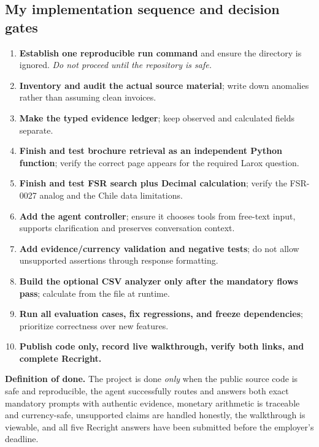 \documentclass[11pt,a4paper]{article}
\DeclareRobustCommand{\code}[1]{{\ttfamily\small\detokenize{#1}}}
\begin{document}
\subsection{My implementation sequence and decision gates}
\begin{enumerate}
\item \textbf{Establish one reproducible run command} and ensure the \code{data/} directory is ignored. \emph{Do not proceed until the repository is safe.}
\item \textbf{Inventory and audit the actual source material}; write down anomalies rather than assuming clean invoices.
\item \textbf{Make the typed evidence ledger}; keep observed and calculated fields separate.
\item \textbf{Finish and test brochure retrieval as an independent Python function}; verify the correct page appears for the required Larox question.
\item \textbf{Finish and test FSR search plus Decimal calculation}; verify the FSR-0027 analog and the Chile data limitations.
\item \textbf{Add the agent controller}; ensure it chooses tools from free-text input, supports clarification and preserves conversation context.
\item \textbf{Add evidence/currency validation and negative tests}; do not allow unsupported assertions through response formatting.
\item \textbf{Build the optional CSV analyzer only after the mandatory flows pass}; calculate from the file at runtime.
\item \textbf{Run all evaluation cases, fix regressions, and freeze dependencies}; prioritize correctness over new features.
\item \textbf{Publish code only, record live walkthrough, verify both links, and complete Recright.}
\end{enumerate}

\begin{keybox}
\textbf{Definition of done.} The project is done \emph{only} when the public source code is safe and reproducible, the agent successfully routes and answers both exact mandatory prompts with authentic evidence, monetary arithmetic is traceable and currency-safe, unsupported claims are handled honestly, the walkthrough is viewable, and all five Recright answers have been submitted before the employer's deadline.
\end{keybox}
\end{document}
